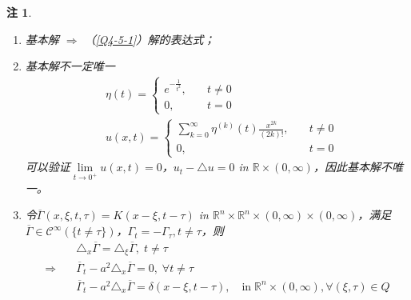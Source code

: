 \documentclass[11pt, a4paper]{article}
\theoremstyle{theorem}
\newtheorem*{note}{注}
\begin{document}
\begin{note}
\begin{enumerate}
  \item 基本解 $\Longrightarrow$ （\ref{Q4-5-1}）解的表达式；
  \item 基本解不一定唯一
  \begin{align}
      &\eta(t) = \begin{cases}
      e^{-\frac{1}{t^2}}, \quad & t \neq 0 \\
      0, \quad &t = 0
      \end{cases} \\
      &u(x,t) = \begin{cases}
      \sum\limits_{k=0}^\infty \eta^{(k)}(t) \frac{x^{2k}}{(2k)!}, \quad &t \neq 0 \\
      0, \quad &t = 0
      \end{cases}
  \end{align}
  可以验证$\lim\limits_{t \rightarrow 0^+}u(x,t) = 0$，$u_t - \triangle u = 0$ in $\mathbb{R} \times (0, \infty)$，因此基本解不唯一。
  \item 令$\overline{\Gamma}(x,\xi,t, \tau) = K(x-\xi, t - \tau)$ in $\mathbb{R}^n \times \mathbb{R}^n \times (0,\infty) \times (0,\infty)$，满足$\overline{\Gamma} \in \mathcal{C}^\infty(\{t \neq \tau\})$，$\Gamma_t = - \Gamma_\tau, t \neq \tau$，则
  \begin{align*}
        &\triangle_x \overline{\Gamma} = \triangle_\xi \overline{\Gamma}, \; t \neq \tau  \\
        \Longrightarrow \quad &\overline{\Gamma}_t - a^2 \triangle_x \overline{\Gamma} = 0, \; \forall t \neq \tau \\
        &\overline{\Gamma}_t - a^2 \triangle_x \overline{\Gamma} = \delta(x-\xi, t - \tau), \quad \text{in} \; \mathbb{R}^n \times (0,\infty), \forall (\xi,\tau) \in Q
  \end{align*}
\end{enumerate}
\end{note}
\end{document}
